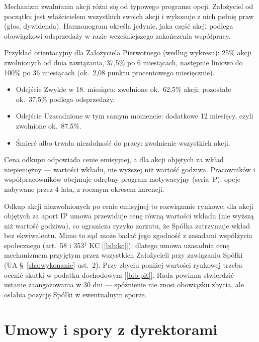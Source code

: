 \documentclass[11pt,a4paper]{report}
\newcommand{\Zr}[1]{[\ref{bib:#1}]}
\begin{document}
\begin{OCoChodzi}
Mechanizm zwalniania akcji różni się od typowego programu opcji. Założyciel od początku jest właścicielem wszystkich swoich akcji i wykonuje z nich pełnię praw (głos, dywidenda). Harmonogram określa jedynie, jaka część akcji podlega obowiązkowi odsprzedaży w razie wcześniejszego zakończenia współpracy.

Przykład orientacyjny dla Założyciela Pierwotnego (według wykresu): 25\% akcji zwolnionych od dnia zawiązania, 37,5\% po 6 miesiącach, następnie liniowo do 100\% po 36 miesiącach (ok.~2,08 punktu procentowego miesięcznie).
\begin{itemize}
  \item Odejście Zwykłe w 18. miesiącu: zwolnione ok.~62,5\% akcji; pozostałe ok.~37,5\% podlega odsprzedaży.
  \item Odejście Uzasadnione w tym samym momencie: dodatkowe 12 miesięcy, czyli zwolnione ok.~87,5\%.
  \item Śmierć albo trwała niezdolność do pracy: zwolnienie wszystkich akcji.
\end{itemize}
Cena odkupu odpowiada cenie emisyjnej, a dla akcji objętych za wkład niepieniężny --- wartości wkładu, nie wyższej niż wartość godziwa. Pracowników i współpracowników obejmuje odrębny program motywacyjny (seria~P): opcje nabywane przez 4 lata, z rocznym okresem karencji.
\end{OCoChodzi}

\begin{Komentarz}
Odkup akcji niezwolnionych po cenie emisyjnej to rozwiązanie rynkowe; dla akcji objętych za aport IP umowa przewiduje cenę równą wartości wkładu (nie wyższą niż wartość godziwa), co ogranicza ryzyko zarzutu, że Spółka zatrzymuje wkład bez ekwiwalentu. Mimo to sąd może badać jego zgodność z zasadami współżycia społecznego (art.~58 i 353$^{1}$ KC \Zr{kc}); dlatego umowa uzasadnia cenę mechanizmem przyjętym przez wszystkich Założycieli przy zawiązaniu Spółki (UA §~\ref{sha:wykonanie} ust.~2). Przy zbyciu poniżej wartości rynkowej trzeba ocenić skutki w podatku dochodowym \Zr{pit}. Rada powinna stwierdzić ustanie zaangażowania w 30 dni --- spóźnienie nie znosi obowiązku zbycia, ale osłabia pozycję Spółki w ewentualnym sporze.
\end{Komentarz}

\section{Umowy i spory z dyrektorami}
\end{document}
